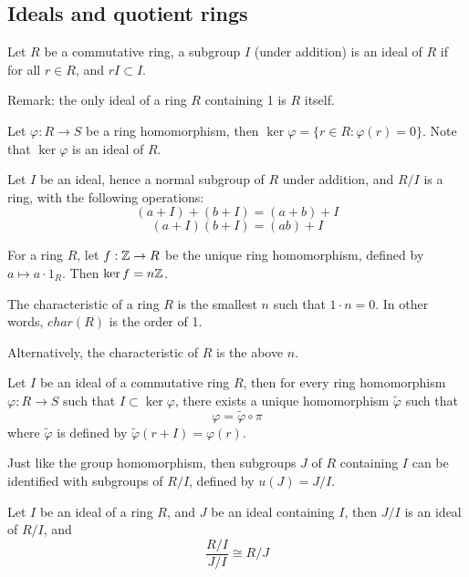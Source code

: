 \subsection{Ideals and quotient rings}
\begin{defn}[ideal]
    Let $R$ be a commutative ring, a subgroup $I$ (under addition) is an ideal of $R$ if for all $r\in R$, and $rI\subset I$.
\end{defn}
Remark: the only ideal of a ring $R$ containing 1 is $R$ itself.
\begin{defn}
    Let $\varphi:R\to S$ be a ring homomorphism, then $\ker\varphi=\{r\in R: \varphi(r)=0\}$. Note that $\ker\varphi$ is an ideal of $R$.
\end{defn}
\begin{defn}
    Let $I$ be an ideal, hence a normal subgroup of $R$ under addition, and $R/I$ is a ring, with the following operations:
    \begin{equation*}
        (a+I)+(b+I)=(a+b)+I
    \end{equation*}
    \begin{equation*}
        (a+I)(b+I)=(ab)+I
    \end{equation*}
\end{defn}
For a ring $R$, let $f:\mathbb{Z}\to R$ be the unique ring homomorphism, defined by $a\mapsto a\cdot 1_R$. Then $\ker f=n\mathbb{Z}$.
\begin{defn}[characteristic]
    The characteristic of a ring $R$ is the smallest $n$ such that $1\cdot n=0$. In other words, $char(R)$ is the order of 1.

    Alternatively, the characteristic of $R$ is the above $n$.
\end{defn}
\begin{thm}
    Let $I$ be an ideal of a commutative ring $R$, then for every ring homomorphism $\varphi: R\to S$ such that $I\subset\ker\varphi$, there exists a unique homomorphism $\tilde{\varphi}$ such that 
    \begin{equation*}
        \varphi=\tilde{\varphi}\circ\pi
    \end{equation*}
    where $\tilde{\varphi}$ is defined by $\tilde{\varphi}(r+I)=\varphi(r)$.
\end{thm}
Just like the group homomorphism, then subgroups $J$ of $R$ containing $I$ can be identified with subgroups of $R/I$, defined by $u(J)=J/I$.
\begin{thm}
    Let $I$ be an ideal of a ring $R$, and $J$ be an ideal containing $I$, then $J/I$ is an ideal of $R/I$, and 
    \begin{equation*}
        \frac{R/I}{J/I}\cong R/J
    \end{equation*}
\end{thm}
